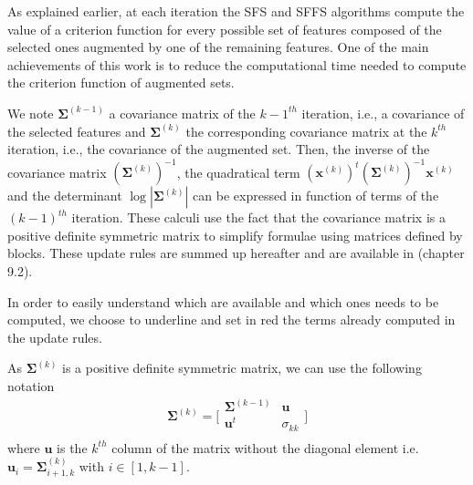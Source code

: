 \documentclass[a4paper,11pt,DIV=16,abstracton]{scrartcl}
\begin{document}
        As explained earlier, at each iteration the SFS and SFFS algorithms compute the value of a criterion function for every possible set of features composed of the selected ones augmented by one of the remaining features. One of the main achievements of this work is to reduce the computational time needed to compute the criterion function of augmented sets.

        We note $\boldsymbol{\Sigma}^{(k-1)}$ a covariance matrix of the $k-1^{th}$ iteration, i.e., a covariance of the selected features and $\boldsymbol{\Sigma}^{(k)}$ the corresponding covariance matrix at the $k^{th}$ iteration, i.e., the covariance of the augmented set. Then, the inverse of the covariance matrix $(\boldsymbol{\Sigma}^{(k)})^{-1}$, the quadratical term $(\mathbf{x}^{(k)})^t (\boldsymbol{\Sigma}^{(k)})^{-1} \mathbf{x}^{(k)}$ and the determinant $\log |\boldsymbol{\Sigma}^{(k)}|$ can be expressed in function of terms of the $(k-1)^{th}$ iteration. These calculi use the fact that the covariance matrix is a positive definite symmetric matrix to simplify formulae using matrices defined by blocks. These update rules are summed up hereafter and are available in \cite{webb2003statistical} (chapter 9.2).

        In order to easily understand which are available and which ones needs to be computed, we choose to underline and set in red the terms already computed in the update rules.

        As $\boldsymbol{\Sigma}^{(k)}$ is a positive definite symmetric matrix, we can use the following notation
        \begin{equation*}
            \boldsymbol{\Sigma}^{(k)} =
            \bigg[\begin{array}{cc}
            \boldsymbol{\Sigma}^{(k-1)} & \mathbf{u}      \\
            \mathbf{u}^t          & \sigma_{kk} \\
            \end{array}\bigg]
        \end{equation*}
        where $\mathbf{u}$ is the $k^{th}$ column of the matrix without the diagonal element i.e. $\mathbf{u}_{i} = \boldsymbol{\Sigma}^{(k)}_{i+1,k}$ with $i \in [1,k-1]$.
\end{document}
